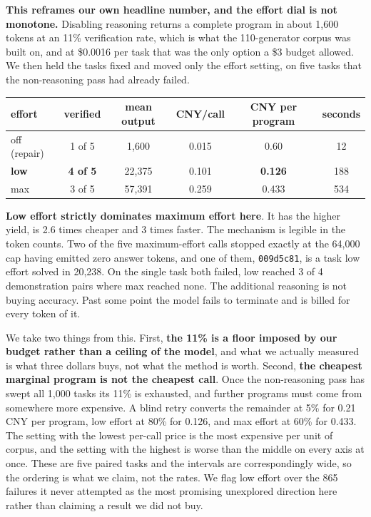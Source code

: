 \documentclass[11pt]{article}
\begin{document}
\textbf{This reframes our own headline number, and the effort dial is not monotone.} Disabling
reasoning returns a complete program in about 1{,}600 tokens at an 11\% verification rate, which is
what the 110-generator corpus was built on, and at \$0.0016 per task that was the only option a \$3
budget allowed. We then held the tasks fixed and moved only the effort setting, on five tasks that the
non-reasoning pass had already failed.

\begin{center}
\begin{tabular}{lccccc}
\toprule
effort & verified & mean output & CNY/call & CNY per program & seconds \\
\midrule
off (repair) & 1 of 5 & 1{,}600 & 0.015 & 0.60 & 12 \\
\textbf{low} & \textbf{4 of 5} & 22{,}375 & 0.101 & \textbf{0.126} & 188 \\
max & 3 of 5 & 57{,}391 & 0.259 & 0.433 & 534 \\
\bottomrule
\end{tabular}
\end{center}

\textbf{Low effort strictly dominates maximum effort here}. It has the higher yield, is 2.6 times cheaper and 3
times faster. The mechanism is legible in the token counts. Two of the five maximum-effort calls
stopped exactly at the 64{,}000 cap having emitted zero answer tokens, and one of them,
\texttt{009d5c81}, is a task low effort solved in 20{,}238. On the single task both failed, low
reached 3 of 4 demonstration pairs where max reached none. The additional reasoning is not buying
accuracy. Past some point the model fails to terminate and is billed for every token of it.

We take two things from this. First, \textbf{the 11\% is a floor imposed by our budget rather than a
ceiling of the model}, and what we actually measured is what three
dollars buys, not what the method is worth. Second, \textbf{the cheapest marginal program is not the
cheapest call}. Once the non-reasoning pass has swept all 1{,}000 tasks its 11\% is exhausted, and
further programs must come from somewhere more expensive. A blind retry converts the remainder at
5\% for 0.21 CNY per program, low effort at 80\% for 0.126, and max effort at 60\% for 0.433. The
setting with the lowest per-call price is the most expensive per unit of corpus, and the setting with
the highest is worse than the middle on every axis at once. These are five paired tasks and the
intervals are correspondingly wide, so the ordering is what we claim, not the rates. We flag low effort
over the 865 failures it never attempted as the most promising unexplored direction here rather than claiming a result we did not buy.
\end{document}
